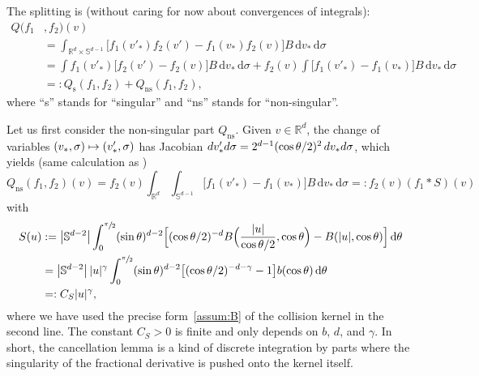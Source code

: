 \documentclass[11pt]{article}
\newcommand\mto{\mathchoice{\longmapsto}{\mapsto}{\mapsto}{\mapsto}}
\newcommand{\ns}{\mathrm{ns}}
\newcommand{\rs}{\mathrm{s}}
\theoremstyle{plain}
\theoremstyle{definition}
\numberwithin{equation}{section}
\newcommand{\R}{\mathbb R}
\newcommand{\Sp}{\mathbb S^{d-1}}
\newcommand{\dd} {\, \mathrm{d}}
\begin{document}
The splitting is (without caring for now about convergences of integrals):
\begin{equation}\label{e:split}
\begin{split}
Q (f_1&,f_2)(v) \\
& = \int_{\R^d \times \Sp} \Big[ f_1(v'_*) f_2(v')
- f_1(v_*) f_2(v) \Big] B \dd v_* \dd \sigma \\
& = \int f_1(v'_*) \big[ f_2(v')-f_2(v) \big] B \dd v_*
\dd \sigma + f_2(v) \int \big[ f_1(v'_*) - f_1(v_*)
\big] B \dd v_* \dd \sigma \\
& =: Q_{\rs}(f_1,f_2) + Q_{\ns}(f_1,f_2),
\end{split}
\end{equation}
where ``s'' stands for ``singular'' and ``ns'' stands for
``non-singular''.

Let us first consider the non-singular part $Q_{\ns}$. Given
$v \in \R^d$, the change of variables
$(v_*,\sigma) \mto (v'_*,\sigma)$ has Jacobian
${\rm d} v'_* {\rm d}\sigma = 2^{d-1} (\cos \theta/2)^2 \, {\rm d} v_*
{\rm d}\sigma$, which yields (same calculation as
\cite[Lem.\,1]{advw})
\begin{equation*}
Q_{\ns}(f_1,f_2)(v) = f_2(v) \int_{\R^d} \int_{\Sp} \big[ f_1(v'_*) - f_1(v_*)
\big] B \dd v_* \dd \sigma
=: f_2(v) (f_1 * S)(v)
\end{equation*}
with
\begin{align*}
S(u) & := \left|\mathbb S^{d-2}\right| \int_0^{\sfrac{\pi}{2}} (\sin
\theta)^{d-2} \Big[ (\cos \theta/2)^{-d}
B\Bigl( \frac{|u|}{\cos\theta/2}, \cos \theta \Bigr) - B(|u|,\cos \theta) \Big]
\dd \theta\\
& = \left|\mathbb S^{d-2}\right| |u|^\gamma
\int_0^{\sfrac{\pi}{2}} (\sin
\theta)^{d-2} \big[ (\cos \theta/2)^{-d-\gamma}
- 1 \big] b(\cos \theta)
\dd \theta \\
& =: C_S |u|^\gamma,
\end{align*}
where we have used the precise form~\eqref{assum:B} of the collision
kernel in the second line. The constant $C_S >0$ is finite and only
depends on $b$, $d$, and $\gamma$. In short, the cancellation lemma is
a kind of discrete integration by parts where the singularity of the
fractional derivative is pushed onto the kernel itself.
\end{document}
